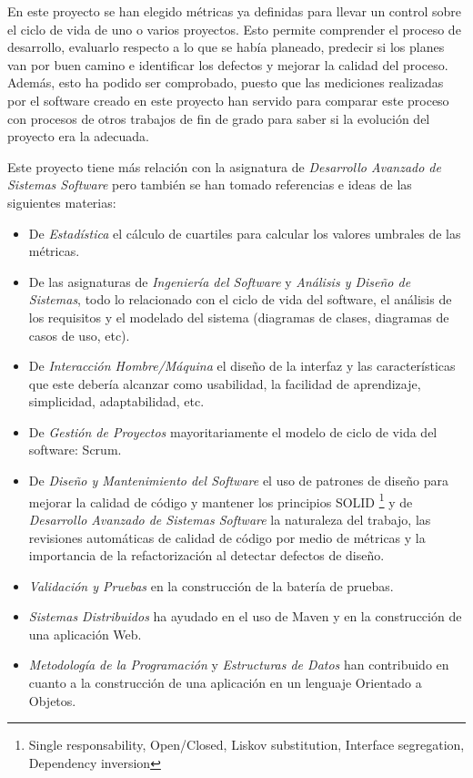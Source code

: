En este proyecto se han elegido métricas ya definidas para llevar un control sobre el ciclo de vida de uno o varios proyectos. Esto permite comprender el proceso de desarrollo, evaluarlo respecto a lo que se había planeado, predecir si los planes van por buen camino e identificar los defectos y mejorar la calidad del proceso. Además, esto ha podido ser comprobado, puesto que las mediciones realizadas por el software creado en este proyecto han servido para comparar este proceso con procesos de otros trabajos de fin de grado para saber si la evolución del proyecto era la adecuada.

Este proyecto tiene más relación con la asignatura de \textit{Desarrollo Avanzado de Sistemas Software} pero también se han tomado referencias e ideas de las siguientes materias: 
\begin{itemize}
	\tightlist
	\item De \textit{Estadística} el cálculo de cuartiles para calcular los valores umbrales de las métricas.
	\item De las asignaturas de \textit{Ingeniería del Software} y \textit{Análisis y Diseño de Sistemas}, todo lo relacionado con el ciclo de vida del software, el análisis de los requisitos y el modelado del sistema (diagramas de clases, diagramas de casos de uso, etc).
	\item De \textit{Interacción Hombre/Máquina}  el diseño de la interfaz y las características que este debería alcanzar como usabilidad, la facilidad de aprendizaje, simplicidad, adaptabilidad, etc.
	\item De \textit{Gestión de Proyectos} mayoritariamente el modelo de ciclo de vida del software: Scrum.
	\item De \textit{Diseño y Mantenimiento del Software} el uso de patrones de diseño para mejorar la calidad de código y mantener los principios SOLID  \footnote{Single responsability, Open/Closed, Liskov substitution, Interface segregation, Dependency inversion} y de \textit{Desarrollo Avanzado de Sistemas Software} la naturaleza del trabajo, las revisiones automáticas de calidad de código por medio de métricas y la importancia de la refactorización al detectar defectos de diseño.
	\item \textit{Validación y Pruebas} en la construcción de la batería de pruebas.
	\item \textit{Sistemas Distribuidos} ha ayudado en el uso de Maven y en la construcción de una aplicación Web.
	\item \textit{Metodología de la Programación} y \textit{Estructuras de Datos} han contribuido en cuanto a la construcción de una aplicación en un lenguaje Orientado a Objetos.
\end{itemize}

